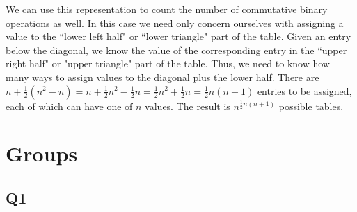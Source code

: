 \documentclass[12pt]{article}
\numberwithin{theorem}{section}
\numberwithin{equation}{section}
\numberwithin{remark}{section}
\numberwithin{definition}{section}
\numberwithin{theorem}{section}
\numberwithin{lemma}{section}
\numberwithin{example}{section}
\begin{document}
\vspace{\baselineskip}

\noindent We can use this representation to count the number of commutative binary operations as well. In this case we need only concern ourselves with assigning a value to the ``lower left half" or ``lower triangle" part of the table. Given an entry below the diagonal, we know the value of the corresponding entry in the ``upper right half" or "upper triangle" part of the table. Thus, we need to know how many ways to assign values to the diagonal plus the lower half. There are $n + \frac{1}{2}(n^2-n) = n + \frac{1}{2}n^2 - \frac{1}{2}n = \frac{1}{2}n^2+\frac{1}{2}n = \frac{1}{2}n(n+1)$ entries to be assigned, each of which can have one of $n$ values. The result is $n^{\frac{1}{2}n(n+1)}$ possible tables. 



\newpage

\section{Groups}

\subsection{Q1}
\end{document}
